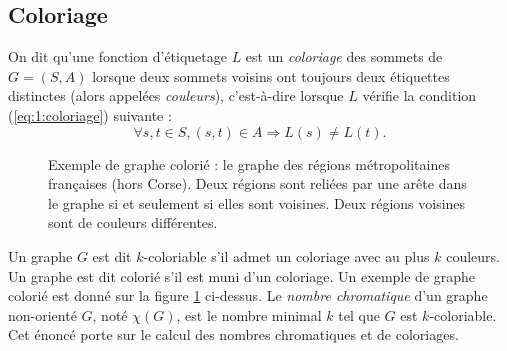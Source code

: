 \subsection*{Coloriage}
On dit qu'une fonction d'étiquetage $L$ est un \emph{coloriage} des sommets de $G = (S,A)$ lorsque deux sommets voisins ont toujours deux étiquettes distinctes (alors appelées \emph{couleurs}), c'est-à-dire lorsque $L$ vérifie la condition (\ref{eq:1:coloriage}) suivante : 
\begin{equation} \label{eq:1:coloriage} \forall s,t \in S, (s,t) \in A \Rightarrow L(s) \neq L(t).
\end{equation}
\begin{figure}[ht]
\centering
{}
\caption{\label{fig:1:france}Exemple de graphe colorié : le graphe des régions métropolitaines françaises (hors Corse). Deux régions sont reliées par une arête dans le graphe si et seulement si elles sont voisines. Deux régions voisines sont de couleurs différentes. }
\end{figure} 

Un graphe $G$ est dit $k$-coloriable s'il admet un coloriage avec au plus $k$ couleurs. Un graphe est dit colorié s'il est muni d'un coloriage. Un exemple de graphe colorié est donné sur la figure \ref{fig:1:france} ci-dessus. 
Le \emph{nombre chromatique} d'un graphe non-orienté $G$, noté $\chi(G)$, est le nombre minimal $k$ tel que $G$ est $k$-coloriable. Cet énoncé porte sur le calcul des nombres chromatiques et de coloriages. 
